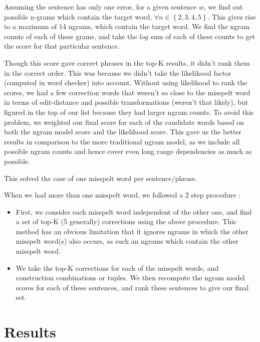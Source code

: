 Assuming the sentence has only one error, for a given sentence $w$, we find out possible n-grams which contain the target word, $\forall n \in \left\lbrace 2,3,4,5 \right\rbrace$. This gives rise to a maximum of 14 ngrams, which contain the target word. We find the ngram counts of each of these grams, and take the $log$ sum of each of these counts to get the score for that particular sentence.



Though this score gave correct phrases in the top-K results, it didn't rank them in the correct order. This was because we didn't take the likelihood factor (computed in word checker) into account. Without using likelihood to rank the scores, we had a few correction words that weren't so close to the misspelt word in terms of edit-distance and possible transformations (weren't that likely), but figured in the top of our list because they had larger ngram counts. To avoid this problem, we weighted our final score for each of the candidate words based on both the ngram model score and the likelihood score. This gave us the better results in comparison to the more traditional ngram model, as we include all possible ngram counts and hence cover even long range dependencies as much as possible.

This solved the case of one misspelt word per sentence/phrase. 

When we had more than one misspelt word, we followed a 2 step procedure :

\begin{itemize}
\itemsep1pt\parskip0pt
\item First, we consider each misspelt word independent of the other one, and find a set of top-K (5 generally) corrections using the above procedure. This method has an obvious limitation that it ignores ngrams in which the other misspelt word(s) also occurs, as such an ngrams which contain the other misspelt word.
\item We take the top-K corrections for each of the misspelt words, and construction combinations or tuples. We then recompute the ngram model scores for each of these sentences, and rank these sentences to give our final set.
\end{itemize}

\section{Results}
